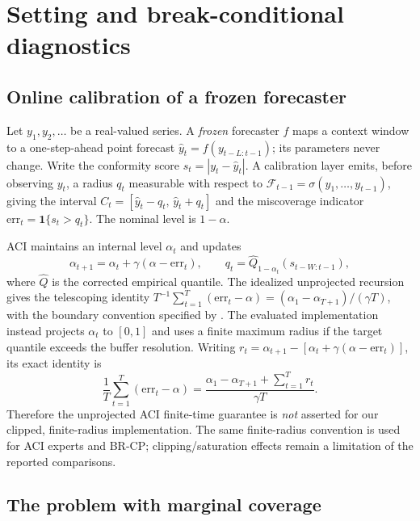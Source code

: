 \documentclass[10pt]{article}
\newcommand{\ind}{\mathbf{1}}
\begin{document}
\section{Setting and break-conditional diagnostics}
\label{sec:metrics}

\subsection{Online calibration of a frozen forecaster}

Let $y_1, y_2, \dots$ be a real-valued series. A \emph{frozen} forecaster $f$
maps a context window to a one-step-ahead point forecast
$\hat{y}_t = f(y_{t-L:t-1})$; its parameters never change. Write the conformity
score $s_t = |y_t - \hat{y}_t|$. A calibration layer emits, before observing
$y_t$, a radius $q_t$ measurable with respect to $\mathcal{F}_{t-1} =
\sigma(y_1,\dots,y_{t-1})$, giving the interval
$C_t = [\hat{y}_t - q_t,\, \hat{y}_t + q_t]$ and the miscoverage indicator
$\mathrm{err}_t = \ind\{s_t > q_t\}$. The nominal level is $1-\alpha$.

ACI maintains an internal level $\alpha_t$ and updates
\begin{equation}
\alpha_{t+1} = \alpha_t+\gamma(\alpha-\mathrm{err}_t),\qquad
q_t=\widehat{Q}_{1-\alpha_t}(s_{t-W:t-1}),
\label{eq:aci}
\end{equation}
where $\widehat Q$ is the corrected empirical quantile. The idealized
unprojected recursion gives the telescoping identity
$T^{-1}\sum_{t=1}^T(\mathrm{err}_t-\alpha)
=(\alpha_1-\alpha_{T+1})/(\gamma T)$, with the boundary convention
specified by \citet{gibbs2021adaptive}. The evaluated implementation instead
projects $\alpha_t$ to $[0,1]$ and uses a finite maximum radius if the target
quantile exceeds the buffer resolution. Writing
$r_t=\alpha_{t+1}-[\alpha_t+\gamma(\alpha-\mathrm{err}_t)]$,
its exact identity is
\begin{equation}
\frac{1}{T}\sum_{t=1}^T(\mathrm{err}_t-\alpha)
=\frac{\alpha_1-\alpha_{T+1}+\sum_{t=1}^T r_t}{\gamma T}.
\label{eq:clipped}
\end{equation}
Therefore the unprojected ACI finite-time guarantee is \emph{not}
asserted for our clipped, finite-radius implementation. The same finite-radius
convention is used for ACI experts and BR-CP; clipping/saturation effects
remain a limitation of the reported comparisons.

\subsection{The problem with marginal coverage}
\end{document}
